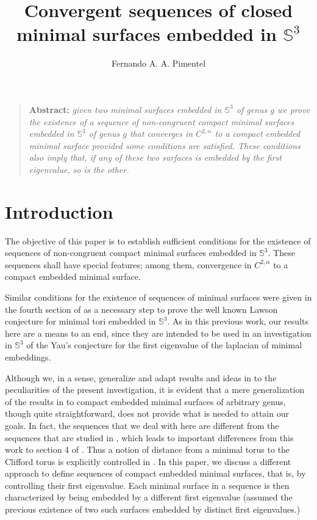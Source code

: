 \documentclass{article}
\def\S3{{\mathbb S^3}}
\begin{document}
\title{\bf Convergent sequences of closed minimal surfaces embedded in $\S3$}

\author{Fernando A. A. Pimentel}



\maketitle

\begin{quotation}\noindent
{\bf Abstract:} \sl given two minimal surfaces embedded in $\S3$ of genus $g$
we prove  the existence of a sequence of non-congruent compact minimal surfaces embedded in $\S3$ of genus $g$ that converges in $C^{2,\alpha}$ to a compact embedded minimal surface provided some conditions are satisfied.  These conditions also imply that, if any of these two surfaces is embedded by the first eigenvalue, so is the other.
\end{quotation}

\allowdisplaybreaks




\section{Introduction}

The objective of this paper is to establish sufficient conditions for the existence of  sequences of non-congruent compact minimal surfaces embedded in $\S3$. These sequences shall have  special features; among them,   convergence in $C^{2,\alpha}$ to a compact embedded minimal surface. 

Similar conditions for the existence of sequences of minimal surfaces were given in the fourth section of \cite{p1} as a necessary step to prove the well known Lawson conjecture for minimal tori 
embedded in $\S3$. As in this previous work, our results here are a means to an end, since they are intended to be used in an investigation in $\S3$ of the Yau's conjecture for the first eigenvalue of the laplacian of minimal embeddings.

  
Although we, in a sense,  generalize and adapt results and ideas in \cite{p1} to the peculiarities of the present investigation, it is evident  that a mere generalization of the results in \cite{p1} to compact embedded minimal surfaces of arbitrary genus, though quite straightforward, does not provide what is needed to attain our goals.  In fact, the sequences that we deal with here are different from the sequences that are studied in \cite{p1}, which leads to important differences from this work to section 4 of \cite{p1}. Thus   a notion of distance from a minimal torus to the Clifford torus is explicitly controlled in \cite{p1}. In this paper,  we   discuss a different approach to define sequences of compact embedded minimal surfaces, that is, by controlling their first eigenvalue. Each minimal surface in a sequence is then characterized by being embedded by a different first eigenvalue (assumed the previous existence of two such surfaces embedded by distinct first eigenvalues.)
\end{document}
